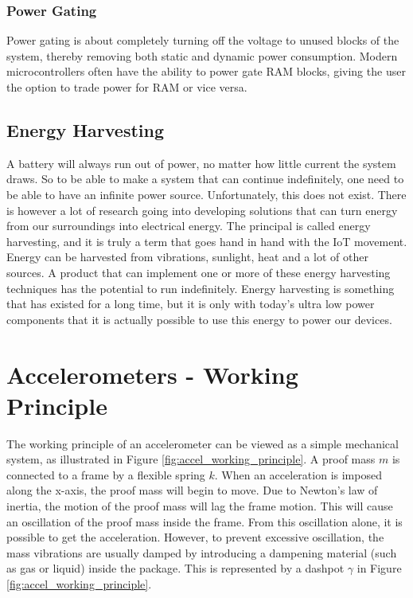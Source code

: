 \subsubsection{Power Gating}

Power gating is about completely turning off the voltage to unused blocks of the system, thereby removing both static and dynamic power consumption. Modern microcontrollers often have the ability to power gate RAM blocks, giving the user the option to trade power for RAM or vice versa.

\subsection{Energy Harvesting}

A battery will always run out of power, no matter how little current the system draws. So to be able to make a system that can continue indefinitely, one need to be able to have an infinite power source. Unfortunately, this does not exist. There is however a lot of research going into developing solutions that can turn energy from our surroundings into electrical energy. The principal is called energy harvesting, and it is truly a term that goes hand in hand with the IoT movement. Energy can be harvested from vibrations, sunlight, heat and a lot of other sources. A product that can implement one or more of these energy harvesting techniques has the potential to run indefinitely. Energy harvesting is something that has existed for a long time, but it is only with today's ultra low power components that it is actually possible to use this energy to power our devices.

\section{Accelerometers - Working Principle} \label{sec:accel_working_principle}

The working principle of an accelerometer can be viewed as a simple mechanical system, as illustrated in Figure \ref{fig:accel_working_principle}. A proof mass $m$ is connected to a frame by a flexible spring $k$. When an acceleration is imposed along the x-axis, the proof mass will begin to move. Due to Newton's law of inertia, the motion of the proof mass will lag the frame motion. This will cause an oscillation of the proof mass inside the frame. From this oscillation alone, it is possible to get the acceleration. However, to prevent excessive oscillation, the mass vibrations are usually damped by introducing a dampening material (such as gas or liquid) inside the package. This is represented by a dashpot $\gamma$ in Figure \ref{fig:accel_working_principle}.

